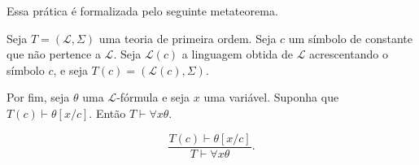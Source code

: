 Essa prática é formalizada pelo seguinte metateorema.

\begin{metatheorem}\label{mlem:generalizacaoUniversal}
    Seja $T=(\mathcal L,\Sigma)$ uma teoria de primeira ordem.
    Seja $c$ um símbolo de constante que não pertence a $\mathcal L$.
    Seja $\mathcal L(c)$ a linguagem obtida de $\mathcal L$ acrescentando o símbolo $c$, e seja $T(c)=(\mathcal L(c),\Sigma)$.

    Por fim, seja $\theta$ uma $\mathcal L$-fórmula e seja $x$ uma variável.
    Suponha que $T(c)\vdash \theta[x/c]$.
    Então $T\vdash \forall x\theta$.

    \[
        \frac{T(c)\vdash \theta[x/c]}
             {T\vdash \forall x\theta}.
    \]
\end{metatheorem}

